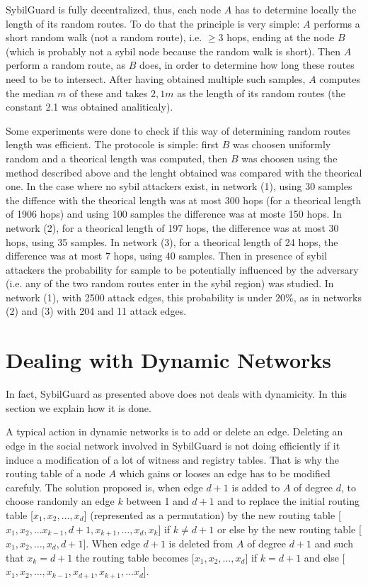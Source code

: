\documentclass[a4paper,11pt]{article}
\begin{document}
SybilGuard is fully decentralized, thus, each node $A$ has to determine locally the length of its random routes.
To do that the principle is very simple: $A$ performs a short random walk (not a random route), i.e. $\geq 3$ hops, ending at the node $B$ (which is probably not a sybil node because the random walk is short).
Then $A$ perform a random route, as $B$ does, in order to determine how long these routes need to be to intersect.
After having obtained multiple such samples, $A$ computes the median $m$ of these and takes $2,1m$ as the length of its random routes (the constant 2.1 was obtained analiticaly).

Some experiments were done to check if this way of determining random routes length was efficient.
The protocole is simple: first $B$ was choosen uniformly random and a theorical length was computed, then $B$ was choosen using the method described above and the lenght obtained was compared with the theorical one.
In the case where no sybil attackers exist, in network (1), using 30 samples the diffence with the theorical length was at most 300 hops (for a theorical length of 1906 hops) and using 100 samples the difference was at moste 150 hops.
In network (2), for a theorical length of 197 hops, the difference was at most 30 hops, using 35 samples.
In network (3), for a theorical length of 24 hops, the difference was at most 7 hops, using 40 samples.  
Then in presence of sybil attackers the probability for sample to be potentially influenced by the adversary (i.e. any of the two random routes enter in the sybil region) was studied.
In network (1), with 2500 attack edges, this probability is under $20\%$, as in networks (2) and (3) with 204 and 11 attack edges.


\section{Dealing with Dynamic Networks}

In fact, SybilGuard as presented above does not deals with dynamicity. 
In this section we explain how it is done.


A typical action in dynamic networks is to add or delete an edge.
Deleting an edge in the social network involved in SybilGuard is not doing efficiently if it induce a modification of a lot of witness and registry tables.
That is why the routing table of a node $A$ which gains or looses an edge has to be modified carefuly.
The solution proposed is, when edge $d+1$ is added to $A$ of degree $d$, to choose randomly an edge $k$ between 1 and $d+1$ and to replace the initial routing table [$x_1,x_2,\dots, x_d$] (represented as a permutation) by the new routing table [$x_1,x_2,\dots x_{k-1},d+1,x_{k+1},\dots, x_d, x_k$] if $k\neq d+1$ or else by the new routing table [$x_1,x_2,\dots ,x_d,d+1$].
When edge $d+1$ is deleted from $A$ of degree $d+1$ and such that $x_k=d+1$ the routing table becomes [$x_1,x_2,\dots, x_d$] if $k=d+1$ and else [$x_1,x_2,\dots, x_{k-1}, x_{d+1}, x_{k+1},\dots x_d$].
\end{document}
